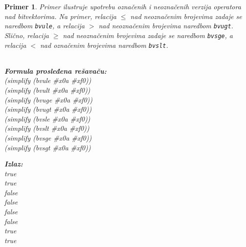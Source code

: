 \documentclass[12pt,oneside]{memoir}
\newtheorem{primer}{Primer}
\begin{document}
\begin{primer} \label{example9} Primer ilustruje upotrebu označenih i neoznačenih verzija operatora nad bitvektorima. Na primer, relacija $\leq$ nad neoznačenim brojevima zadaje se naredbom \texttt{bvule}, a relacija $>$ nad neoznačenim brojevima naredbom \texttt{bvugt}. Slično, relacija $\geq$ nad neoznačenim brojevima zadaje se naredbom \texttt{bvsge}, a relacija $<$ nad označenim brojevima naredbom \texttt{bvslt}.
\\ \\ 
\begin{minipage}[b]{0.5\textwidth}
\textbf{Formula prosleđena rešavaču:}
\\(simplify (bvule \#x0a \#xf0))  
\\(simplify (bvult \#x0a \#xf0))  
\\(simplify (bvuge \#x0a \#xf0))  
\\(simplify (bvugt \#x0a \#xf0))  
\\(simplify (bvsle \#x0a \#xf0)) 
\\(simplify (bvslt \#x0a \#xf0))  
\\(simplify (bvsge \#x0a \#xf0))  
\\(simplify (bvsgt \#x0a \#xf0))

\end{minipage}
\hspace{2cm} 
\begin{minipage}[t]{0.5\textwidth}
\vspace{-5.3cm}
\textbf{Izlaz:}
\\true 
\\true 
\\false 
\\false 
\\false 
\\false 
\\true 
\\true
\end{minipage}


\end{primer}
\end{document}
